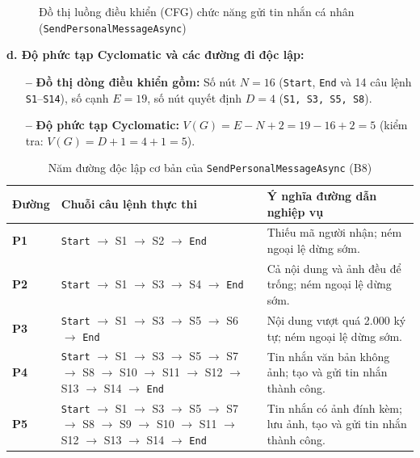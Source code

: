 \documentclass[11pt,a4paper]{article}
\begin{document}
\begin{figure}[H]
\caption{Đồ thị luồng điều khiển (CFG) chức năng gửi tin nhắn cá nhân (\texttt{SendPersonalMessageAsync})}
\end{figure}

\noindent\textbf{d. Độ phức tạp Cyclomatic và các đường đi độc lập:}
\begin{itemize}[leftmargin=1.2cm, noitemsep]
    \item[\textbf{--}] \textbf{Đồ thị dòng điều khiển gồm:} Số nút $N = 16$ (\texttt{Start}, \texttt{End} và 14 câu lệnh \texttt{S1}--\texttt{S14}), số cạnh $E = 19$, số nút quyết định $D = 4$ (\texttt{S1, S3, S5, S8}).
    \item[\textbf{--}] \textbf{Độ phức tạp Cyclomatic:} $V(G) = E - N + 2 = 19 - 16 + 2 = 5$ (kiểm tra: $V(G) = D + 1 = 4 + 1 = 5$).
\end{itemize}
\begin{table}[H]
\centering
\small
\begin{tabularx}{\textwidth}{|C{1.3cm}|L{7.5cm}|X|}
\hline
{}
\textbf{Đường} & \textbf{Chuỗi câu lệnh thực thi} & \textbf{Ý nghĩa đường dẫn nghiệp vụ} \tabularnewline
\hline
\textbf{P1} & \texttt{Start} $\rightarrow$ S1 $\rightarrow$ S2 $\rightarrow$ \texttt{End} & Thiếu mã người nhận; ném ngoại lệ dừng sớm. \\ \hline
\textbf{P2} & \texttt{Start} $\rightarrow$ S1 $\rightarrow$ S3 $\rightarrow$ S4 $\rightarrow$ \texttt{End} & Cả nội dung và ảnh đều để trống; ném ngoại lệ dừng sớm. \\ \hline
\textbf{P3} & \texttt{Start} $\rightarrow$ S1 $\rightarrow$ S3 $\rightarrow$ S5 $\rightarrow$ S6 $\rightarrow$ \texttt{End} & Nội dung vượt quá 2.000 ký tự; ném ngoại lệ dừng sớm. \\ \hline
\textbf{P4} & \texttt{Start} $\rightarrow$ S1 $\rightarrow$ S3 $\rightarrow$ S5 $\rightarrow$ S7 $\rightarrow$ S8 $\rightarrow$ S10 $\rightarrow$ S11 $\rightarrow$ S12 $\rightarrow$ S13 $\rightarrow$ S14 $\rightarrow$ \texttt{End} & Tin nhắn văn bản không ảnh; tạo và gửi tin nhắn thành công. \\ \hline
\textbf{P5} & \texttt{Start} $\rightarrow$ S1 $\rightarrow$ S3 $\rightarrow$ S5 $\rightarrow$ S7 $\rightarrow$ S8 $\rightarrow$ S9 $\rightarrow$ S10 $\rightarrow$ S11 $\rightarrow$ S12 $\rightarrow$ S13 $\rightarrow$ S14 $\rightarrow$ \texttt{End} & Tin nhắn có ảnh đính kèm; lưu ảnh, tạo và gửi tin nhắn thành công. \\ \hline
\end{tabularx}
\caption{Năm đường độc lập cơ bản của \texttt{SendPersonalMessageAsync} (B8)}
\end{table}
\end{document}
